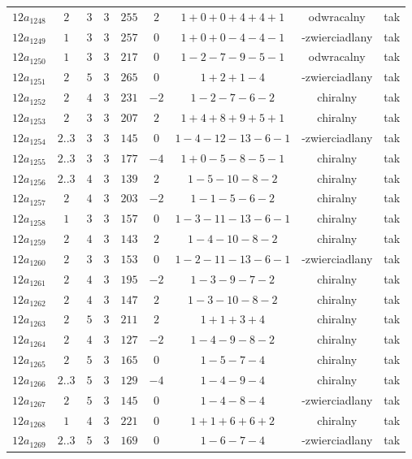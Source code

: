 \begin{longtable}{ccccccccc}
$12a_{1248}$ & $2$ & $3$ & $3$ & $255$ & $2$ & $1+0+0+4+4+1$ & odwracalny & tak \\
$12a_{1249}$ & $1$ & $3$ & $3$ & $257$ & $0$ & $1+0+0-4-4-1$ & -zwierciadlany & tak \\
$12a_{1250}$ & $1$ & $3$ & $3$ & $217$ & $0$ & $1-2-7-9-5-1$ & odwracalny & tak \\
$12a_{1251}$ & $2$ & $5$ & $3$ & $265$ & $0$ & $1+2+1-4$ & -zwierciadlany & tak \\
$12a_{1252}$ & $2$ & $4$ & $3$ & $231$ & $-2$ & $1-2-7-6-2$ & chiralny & tak \\
$12a_{1253}$ & $2$ & $3$ & $3$ & $207$ & $2$ & $1+4+8+9+5+1$ & chiralny & tak \\
$12a_{1254}$ & $2..3$ & $3$ & $3$ & $145$ & $0$ & $1-4-12-13-6-1$ & -zwierciadlany & tak \\
$12a_{1255}$ & $2..3$ & $3$ & $3$ & $177$ & $-4$ & $1+0-5-8-5-1$ & chiralny & tak \\
$12a_{1256}$ & $2..3$ & $4$ & $3$ & $139$ & $2$ & $1-5-10-8-2$ & chiralny & tak \\
$12a_{1257}$ & $2$ & $4$ & $3$ & $203$ & $-2$ & $1-1-5-6-2$ & chiralny & tak \\
$12a_{1258}$ & $1$ & $3$ & $3$ & $157$ & $0$ & $1-3-11-13-6-1$ & chiralny & tak \\
$12a_{1259}$ & $2$ & $4$ & $3$ & $143$ & $2$ & $1-4-10-8-2$ & chiralny & tak \\
$12a_{1260}$ & $2$ & $3$ & $3$ & $153$ & $0$ & $1-2-11-13-6-1$ & -zwierciadlany & tak \\
$12a_{1261}$ & $2$ & $4$ & $3$ & $195$ & $-2$ & $1-3-9-7-2$ & chiralny & tak \\
$12a_{1262}$ & $2$ & $4$ & $3$ & $147$ & $2$ & $1-3-10-8-2$ & chiralny & tak \\
$12a_{1263}$ & $2$ & $5$ & $3$ & $211$ & $2$ & $1+1+3+4$ & chiralny & tak \\
$12a_{1264}$ & $2$ & $4$ & $3$ & $127$ & $-2$ & $1-4-9-8-2$ & chiralny & tak \\
$12a_{1265}$ & $2$ & $5$ & $3$ & $165$ & $0$ & $1-5-7-4$ & chiralny & tak \\
$12a_{1266}$ & $2..3$ & $5$ & $3$ & $129$ & $-4$ & $1-4-9-4$ & chiralny & tak \\
$12a_{1267}$ & $2$ & $5$ & $3$ & $145$ & $0$ & $1-4-8-4$ & -zwierciadlany & tak \\
$12a_{1268}$ & $1$ & $4$ & $3$ & $221$ & $0$ & $1+1+6+6+2$ & chiralny & tak \\
$12a_{1269}$ & $2..3$ & $5$ & $3$ & $169$ & $0$ & $1-6-7-4$ & -zwierciadlany & tak \\

\end{longtable}
